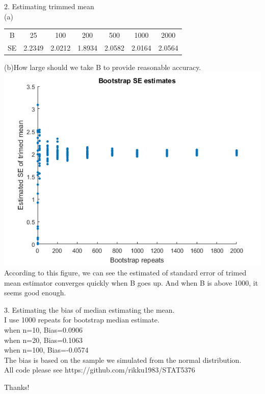 \documentclass[11pt]{scrartcl}
\begin{document}
2. Estimating trimmed mean\\
(a)\\
\begin{tabular}{ c c c c c c c}
 B & 25 & 100 & 200 & 500 & 1000 & 2000\\ 
 SE & 2.2349 & 2.0212 & 1.8934 & 2.0582 & 2.0164 & 2.0564 
\end{tabular}
\medskip

(b)How large should we take B to provide reasonable accuracy.\\
\includegraphics[scale=1]{hw32.png}\\
According to this figure, we can see the estimated of standard error of trimed mean estimator converges quickly when B goes up. And when B is above 1000, it seems good enough.\\ 
\bigskip

3. Estimating the bias of median estimating the mean.\\
I use 1000 repeats for bootstrap median estimate. \\
when n=10, Bias=0.0906\\
when n=20, Bias=0.1063\\
when n=100, Bias=-0.0574\\
The bias is based on the sample we simulated from the normal distribution.\\  

All code please see https://github.com/rikku1983/STAT5376\\
\bigskip

Thanks!
\end{document}
